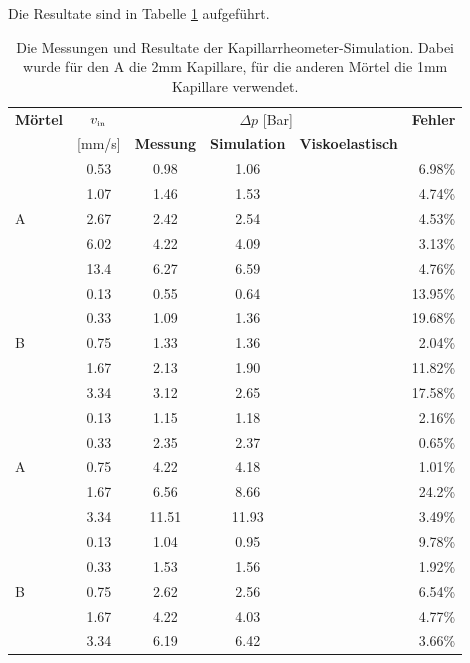 Die Resultate sind in Tabelle \ref{fig:kapRheoResults} aufgeführt.

%
\begin{table}[bt]
    \centering
    \begin{tabular}{l c c c c r}
        \multicolumn{1}{l}{\textbf{Mörtel}}& 
        \multicolumn{1}{c}{\textbf{$v_\text{\tiny in}$}} & 
        \multicolumn{3}{c}{$\Delta p$ [Bar]} & 
        \multicolumn{1}{l}{\textbf{Fehler}} \\
        & 
        \multicolumn{1}{l}{[mm/s]} & 
        \multicolumn{1}{l}{\textbf{Messung}} & 
        \multicolumn{1}{l}{\textbf{Simulation}} &
        \multicolumn{1}{l}{\textbf{Viskoelastisch}} &
        \\
        \hline
        \multirow{5}{*}{\hit{} A} & 0.53 & 0.98 & 1.06 & & 6.98\%\\
                                  & 1.07 & 1.46 & 1.53 & & 4.74\%\\
                                  & 2.67 & 2.42 & 2.54 & & 4.53\%\\
                                  & 6.02 & 4.22 & 4.09 & & 3.13\%\\
                                  & 13.4 & 6.27 & 6.59 & & 4.76\%\\
        \hline
        \multirow{5}{*}{\hit{} B} & 0.13 & 0.55 & 0.64 & & 13.95\%\\
                                  & 0.33 & 1.09 & 1.36 & & 19.68\%\\
                                  & 0.75 & 1.33 & 1.36 & & 2.04\%\\
                                  & 1.67 & 2.13 & 1.90 & & 11.82\%\\
                                  & 3.34 & 3.12 & 2.65 & & 17.58\%\\
        \hline
        \multirow{5}{*}{\re{} A}  & 0.13 &  1.15 &  1.18 & & 2.16\%\\
                                  & 0.33 &  2.35 &  2.37 & & 0.65\%\\
                                  & 0.75 &  4.22 &  4.18 & & 1.01\%\\
                                  & 1.67 &  6.56 &  8.66 & & 24.2\%\\
                                  & 3.34 & 11.51 & 11.93 & & 3.49\%\\
        \hline
        \multirow{5}{*}{\re{} B}  & 0.13 & 1.04 & 0.95 & & 9.78\%\\
                                  & 0.33 & 1.53 & 1.56 & & 1.92\%\\
                                  & 0.75 & 2.62 & 2.56 & & 6.54\%\\
                                  & 1.67 & 4.22 & 4.03 & & 4.77\%\\
                                  & 3.34 & 6.19 & 6.42 & & 3.66\%\\
    \end{tabular}
    \caption{Die Messungen und Resultate der Kapillarrheometer-Simulation. Dabei wurde für den \hit{} A die 2mm Kapillare, für die anderen Mörtel die 1mm Kapillare verwendet.}
    \label{fig:kapRheoResults}
\end{table}
